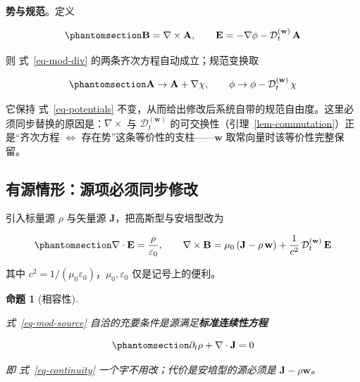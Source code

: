 \documentclass[
  chinese,
  a4paper,
  UTF8,
  12pt,
  oneside,
  openany]{ctexbook}
\theoremstyle{plain}
\theoremstyle{plain}
\theoremstyle{plain}
\newtheorem{proposition}{命题}[chapter]
\theoremstyle{definition}
\theoremstyle{plain}
\theoremstyle{plain}
\theoremstyle{remark}
\begin{document}
\textbf{势与规范}。定义

\begin{equation}\protect\phantomsection\label{eq-potentials}{
\mathbf{B} = \nabla\times\mathbf{A},
\qquad
\mathbf{E} = -\nabla\phi - \mathcal{D}_{t}^{(\mathbf{w})}\,\mathbf{A}
}\end{equation}

则 式~\ref{eq-mod-div} 的两条齐次方程自动成立；规范变换取

\begin{equation}\protect\phantomsection\label{eq-gauge-transform}{
\mathbf{A} \to \mathbf{A} + \nabla\chi,
\qquad
\phi \to \phi - \mathcal{D}_{t}^{(\mathbf{w})}\,\chi
}\end{equation}

它保持 式~\ref{eq-potentials}
不变，从而给出修改后系统自带的规范自由度。这里必须同步替换的原因是：\(\nabla\times\)
与 \(\mathcal{D}_t^{(\mathbf{w})}\)
的可交换性（引理~\ref{lem-commutation}）正是``齐次方程
\(\Leftrightarrow\) 存在势''这条等价性的支柱------\(\mathbf{w}\)
取常向量时该等价性完整保留。

\subsection{有源情形：源项必须同步修改}\label{ux6709ux6e90ux60c5ux5f62ux6e90ux9879ux5fc5ux987bux540cux6b65ux4feeux6539}

引入标量源 \(\rho\) 与矢量源 \(\mathbf{J}\)，把高斯型与安培型改为

\begin{equation}\protect\phantomsection\label{eq-mod-source}{
\nabla\cdot\mathbf{E} = \frac{\rho}{\varepsilon_{0}},
\qquad
\nabla\times\mathbf{B} = \mu_{0}\left(\mathbf{J} - \rho\,\mathbf{w}\right) + \frac{1}{c^{2}}\,\mathcal{D}_{t}^{(\mathbf{w})}\,\mathbf{E}
}\end{equation}

其中 \(c^{2}=1/(\mu_{0}\varepsilon_{0})\)，\(\mu_{0},\varepsilon_{0}\)
仅是记号上的便利。

\begin{proposition}[相容性]\protect\hypertarget{prp-consistency}{}\label{prp-consistency}

式~\ref{eq-mod-source} 自洽的充要条件是源满足\textbf{标准连续性方程}

\begin{equation}\protect\phantomsection\label{eq-continuity}{
\partial_{t}\rho + \nabla\cdot\mathbf{J} = 0
}\end{equation}

即 式~\ref{eq-continuity} 一个字不用改；代价是安培型的源必须是
\(\mathbf{J}-\rho\mathbf{w}\)。

\end{proposition}
\end{document}
